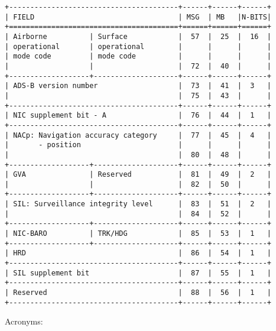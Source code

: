 \begin{verbatim}
+----------------------------------------+------+------+------+
| FIELD                                  | MSG  | MB   |N-BITS|
+========================================+======+======+======+
| Airborne          | Surface            |  57  |  25  |  16  |
| operational       | operational        |      |      |      |
| mode code         | mode code          |      |      |      |
|                   |                    |  72  |  40  |      |
+-------------------+--------------------+------+------+------+
| ADS-B version number                   |  73  |  41  |  3   |
|                                        |  75  |  43  |      |
+----------------------------------------+------+------+------+
| NIC supplement bit - A                 |  76  |  44  |  1   |
+----------------------------------------+------+------+------+
| NACp: Navigation accuracy category     |  77  |  45  |  4   |
|       - position                       |      |      |      |
|                                        |  80  |  48  |      |
+-------------------+--------------------+------+------+------+
| GVA               | Reserved           |  81  |  49  |  2   |
|                   |                    |  82  |  50  |      |
+-------------------+--------------------+------+------+------+
| SIL: Surveillance integrity level      |  83  |  51  |  2   |
|                                        |  84  |  52  |      |
+-------------------+--------------------+------+------+------+
| NIC-BARO          | TRK/HDG            |  85  |  53  |  1   |
+-------------------+--------------------+------+------+------+
| HRD                                    |  86  |  54  |  1   |
+----------------------------------------+------+------+------+
| SIL supplement bit                     |  87  |  55  |  1   |
+----------------------------------------+------+------+------+
| Reserved                               |  88  |  56  |  1   |
+----------------------------------------+------+------+------+
\end{verbatim}

Acronyms:

